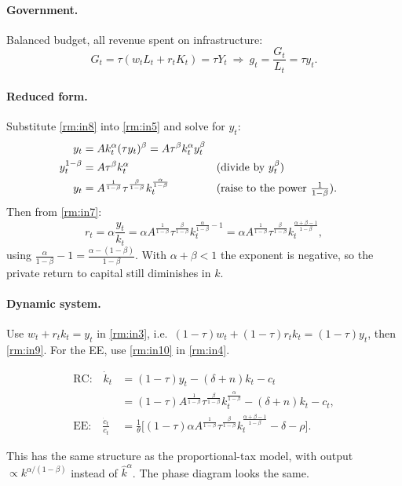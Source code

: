 \paragraph{Government.} Balanced budget, all revenue spent on infrastructure:
\begin{equation}
G_t=\tau(w_tL_t+r_tK_t)=\tau Y_t\ \Longrightarrow\ g_t=\frac{G_t}{L_t}=\tau y_t . \label{rm:in8}
\end{equation}

\paragraph{Reduced form.} Substitute \eqref{rm:in8} into \eqref{rm:in5} and solve for $y_t$:
\begin{align}
y_t&=Ak_t^\alpha(\tau y_t)^\beta=A\tau^\beta k_t^\alpha y_t^\beta \notag\\
y_t^{1-\beta}&=A\tau^\beta k_t^\alpha &&\text{(divide by $y_t^\beta$)} \notag\\
y_t&=A^{\frac1{1-\beta}}\tau^{\frac{\beta}{1-\beta}}k_t^{\frac{\alpha}{1-\beta}} &&\text{(raise to the power $\tfrac1{1-\beta}$).} \label{rm:in9}
\end{align}
Then from \eqref{rm:in7}:
\begin{equation}
r_t=\alpha\frac{y_t}{k_t}=\alpha A^{\frac1{1-\beta}}\tau^{\frac{\beta}{1-\beta}}k_t^{\frac{\alpha}{1-\beta}-1}
=\alpha A^{\frac1{1-\beta}}\tau^{\frac{\beta}{1-\beta}}k_t^{\frac{\alpha+\beta-1}{1-\beta}}, \label{rm:in10}
\end{equation}
using $\frac{\alpha}{1-\beta}-1=\frac{\alpha-(1-\beta)}{1-\beta}$. With $\alpha+\beta<1$ the exponent is negative, so the private return to capital still diminishes in $k$.

\paragraph{Dynamic system.} Use $w_t+r_tk_t=y_t$ in \eqref{rm:in3}, i.e.\ $(1-\tau)w_t+(1-\tau)r_tk_t=(1-\tau)y_t$, then \eqref{rm:in9}. For the EE, use \eqref{rm:in10} in \eqref{rm:in4}.
\begin{keybox}[title={Infrastructure model}]
\begin{align*}
\text{RC:}\quad \dot k_t&=(1-\tau)y_t-(\delta+n)k_t-c_t\\
&=(1-\tau)A^{\frac1{1-\beta}}\tau^{\frac{\beta}{1-\beta}}k_t^{\frac{\alpha}{1-\beta}}-(\delta+n)k_t-c_t,\\
\text{EE:}\quad \frac{\dot c_t}{c_t}&=\frac1\theta\Big[(1-\tau)\alpha A^{\frac1{1-\beta}}\tau^{\frac{\beta}{1-\beta}}k_t^{\frac{\alpha+\beta-1}{1-\beta}}-\delta-\rho\Big].
\end{align*}
\end{keybox}
This has the same structure as the proportional-tax model, with output $\propto k^{\alpha/(1-\beta)}$ instead of $\hat k^\alpha$. The phase diagram looks the same.

